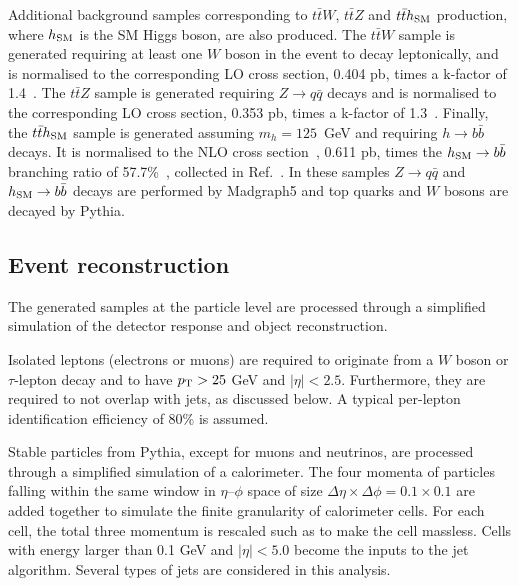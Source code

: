 \documentclass[preprintnumbers,superscriptaddress,nofootinbib,aps,prd,floatfix]{revtex4}
\newcommand{\pt}{p_{\rm{T}}}
\newcommand{\ttbar}{\ensuremath{t\bar{t}}}
\begin{document}
Additional background samples corresponding to $\ttbar W$, $\ttbar Z$ and $\ttbar h_{\rm SM}$ production, where $h_{\rm SM}$ is the SM Higgs boson,
are also produced. The $\ttbar W$ sample is generated requiring at least one $W$ boson in the event to decay leptonically,
and is normalised to the corresponding LO cross section, 0.404 pb, times a k-factor of 1.4~\cite{Garzelli:2012bn}.
The $\ttbar Z$ sample is generated requiring $Z \to q\bar{q}$ decays and is normalised
to the corresponding LO cross section, 0.353 pb, times a k-factor of 1.3~\cite{Garzelli:2012bn}.
Finally, the $\ttbar h_{\rm SM}$ sample is generated assuming $m_h=125$~GeV and requiring $h \to b\bar{b}$ decays.
It is normalised to the NLO cross section~\cite{Dawson:2003zu,Beenakker:2002nc,Beenakker:2001rj}, 0.611 pb, 
times the $h_{\rm SM} \to b\bar{b}$ branching ratio of 57.7\%~\cite{Djouadi:1997yw,Bredenstein:2006rh,Actis:2008ts,Denner:2011mq},
collected in Ref.~\cite{Dittmaier:2011ti}.
In these samples $Z \to q\bar{q}$ and $h_{\rm SM} \to b\bar{b}$ decays are performed by {\sc Madgraph5} and top quarks 
and $W$ bosons are decayed by {\sc Pythia}. 

\subsection{Event reconstruction}
\label{sec:event_reco}

The generated  samples at the particle level are processed through a simplified simulation of the detector
response and object reconstruction.

Isolated leptons (electrons or muons) are required to originate from a $W$ boson or $\tau$-lepton decay and
to have $\pt>25$ GeV and $|\eta|<2.5$. Furthermore, they are required to not overlap with jets, as discussed
below. A typical per-lepton identification efficiency of 80\% is assumed.

Stable particles from {\sc Pythia}, except for muons and neutrinos, are processed through a simplified
simulation of a calorimeter. The four momenta of particles falling within the same window in $\eta$--$\phi$ space of 
size $\Delta\eta \times \Delta\phi = 0.1\times 0.1$ are added together to simulate the finite granularity of
calorimeter cells. For each cell, the total three momentum is rescaled such as to make the cell massless.
Cells with energy larger than 0.1 GeV and $|\eta|<5.0$ become the inputs to the jet algorithm.
Several types of jets are considered in this analysis.
\end{document}
